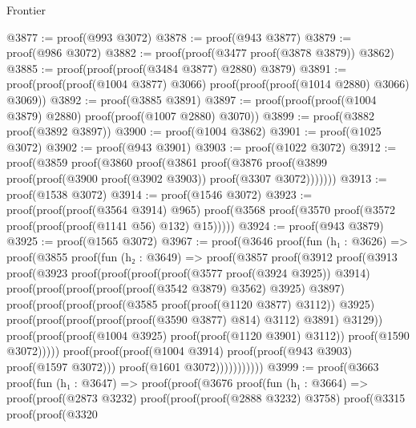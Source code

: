 \begin{lexlean}{Frontier}
\begin{coremodule}
@3877 := proof(@993 @3072)
@3878 := proof(@943 @3877)
@3879 := proof(@986 @3072)
@3882 := proof(proof(@3477 proof(@3878 @3879)) @3862)
@3885 := proof(proof(proof(@3484 @3877) @2880) @3879)
@3891 := proof(proof(proof(@1004 @3877) @3066) proof(proof(proof(@1014 @2880) @3066) @3069))
@3892 := proof(@3885 @3891)
@3897 := proof(proof(proof(@1004 @3879) @2880) proof(proof(@1007 @2880) @3070))
@3899 := proof(@3882 proof(@3892 @3897))
@3900 := proof(@1004 @3862)
@3901 := proof(@1025 @3072)
@3902 := proof(@943 @3901)
@3903 := proof(@1022 @3072)
@3912 := proof(@3859
      proof(@3860
          proof(@3861
              proof(@3876 proof(@3899 proof(proof(@3900 proof(@3902 @3903)) proof(@3307 @3072)))))))
@3913 := proof(@1538 @3072)
@3914 := proof(@1546 @3072)
@3923 := proof(proof(proof(@3564 @3914) @965)
      proof(@3568 proof(@3570 proof(@3572 proof(proof(proof(@1141 @56) @132) @15)))))
@3924 := proof(@943 @3879)
@3925 := proof(@1565 @3072)
@3967 := proof(@3646
      proof(fun (h₁ : @3626) =>
        proof(@3855
            proof(fun (h₂ : @3649) =>
              proof(@3857
                  proof(@3912
                      proof(@3913
                          proof(@3923
                              proof(proof(proof(proof(@3577 proof(@3924 @3925)) @3914)
                                    proof(proof(proof(proof(proof(@3542 @3879) @3562) @3925) @3897)
                                        proof(proof(proof(proof(@3585
                                                  proof(proof(@1120 @3877) @3112))
                                                @3925)
                                              proof(proof(proof(proof(proof(@3590 @3877) @814)
                                                      @3112)
                                                    @3891)
                                                  @3129))
                                            proof(proof(proof(@1004 @3925)
                                                  proof(proof(@1120 @3901) @3112))
                                                proof(@1590 @3072)))))
                                  proof(proof(proof(@1004 @3914)
                                        proof(proof(@943 @3903) proof(@1597 @3072)))
                                      proof(@1601 @3072)))))))))))
@3999 := proof(@3663
      proof(fun (h₁ : @3647) =>
        proof(proof(@3676
              proof(fun (h₁ : @3664) =>
                proof(proof(@2873 @3232)
                    proof(proof(proof(@2888 @3232) @3758)
                        proof(@3315
                            proof(proof(@3320

\end{coremodule}
\end{lexlean}
